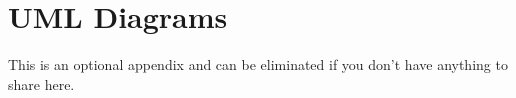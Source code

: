 \chapter{UML Diagrams}

This is an optional appendix and can be eliminated if you don't have anything 
to share here.

